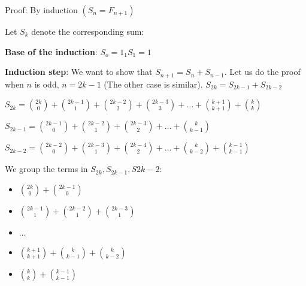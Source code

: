 \documentclass[9pt, letterpaper, oneside]{article}
\begin{document}
Proof: By induction $(S_n = F_{n+1})$

Let $S_k$ denote the corresponding sum:

\textbf{Base of the induction}: $S_o = 1_1S_1 = 1$

\textbf{Induction step}: We want to show that $S_{n+1} = S_n + S_{n-1}$. Let us do the proof when $n$ is odd, $n=2k-1$ (The other case is similar).
$S_{2k} = S_{2k-1} + S_{2k-2}$

$S_{2k} = {2k \choose 0} + {2k - 1 \choose 1} + {2k - 2 \choose 2} + {2k - 3 \choose 3} + \ldots + {k + 1 \choose k + 1} + {k \choose k}$

$S_{2k -1} = {2k - 1 \choose 0} + {2k - 2 \choose 1} + {2k - 3 \choose 2} + \ldots + {k \choose k - 1}$

$S_{2k -2} = {2k - 2 \choose 0} + {2k - 3 \choose 1} + {2k - 4 \choose 2} + \ldots + {k \choose k - 2} + {k - 1 \choose k - 1}$

We group the terms in $S_{2k}, S_{2k -1}, S{2k -2}$:
\begin{itemize}
\item ${2k \choose 0} + {2k - 1 \choose 0}$
\item ${2k - 1 \choose 1} + {2k - 2 \choose 1} + {2k - 3 \choose 1}$
\item $\ldots$
\item ${k + 1 \choose k + 1} + {k \choose k - 1} + {k \choose k - 2}$
\item ${k \choose k} + {k - 1 \choose k - 1}$
\end{itemize}
\end{document}
